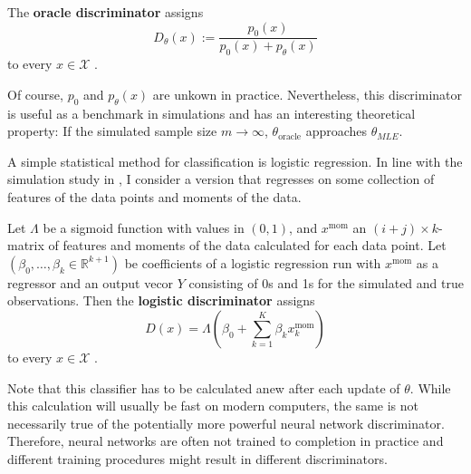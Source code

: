 \begin{definition}
    The \textbf{oracle discriminator} assigns
    \begin{equation}
        D_\theta(x):=\frac{p_0(x)}{p_0(x)+p_\theta(x)} %
    \end{equation}
    to every $x \in \mathcal{X}$ . %
\end{definition}

Of course, $p_0$ and $p_\theta(x)$ are unkown in practice.
Nevertheless, this discriminator is useful as a benchmark in simulations and has an interesting theoretical property:
If the simulated sample size $m \rightarrow \infty$, $\theta_{\text{oracle}}$ approaches $\theta_{MLE}$. %

A simple statistical method for classification is logistic regression.
In line with the simulation study in \textcite{kaji2023adversarial}, I consider a version that regresses on some collection of features of the data points and moments of the data.

\begin{definition}
    Let $\Lambda$ be a sigmoid function with values in $(0,1)$, and $x^{\textrm{mom}}$ an $(i+j)\times k$-matrix of features and moments of the data calculated for each data point.
    Let $(\beta_0, \ldots,\beta_k \in \mathbb{R}^{k+1})$ be coefficients of a logistic regression run with $x^{\textrm{mom}}$ as a regressor and an output vecor $Y$ consisting of 0s and 1s for the simulated and true observations. %
    Then the \textbf{logistic discriminator} assigns
    \begin{equation}
        D(x) = \Lambda(\beta_{0} + \sum_{k=1}^{K}\beta_{k} x_{k}^{\textrm{mom}}) %
    \end{equation}
    to every $x \in \mathcal{X}$ . %
\end{definition}

Note that this classifier has to be calculated anew after each update of $\theta$.
While this calculation will usually be fast on modern computers, the same is not necessarily true of the potentially more powerful neural network discriminator.
Therefore, neural networks are often not trained to completion in practice and different training procedures might result in different discriminators.

